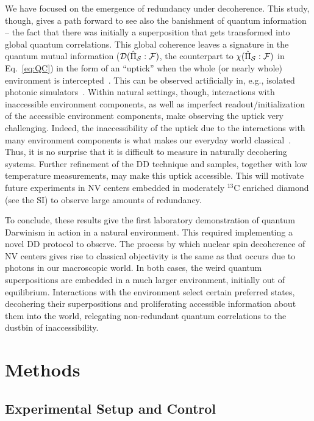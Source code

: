 \documentclass[aps,prl,floatfix,twocolumn,footinbib,superscriptaddress]{revtex4-1}
\begin{document}
We have focused on the emergence of redundancy under decoherence. This study, though, gives a path forward to see also the banishment of quantum information -- the fact that there was initially a superposition that gets transformed into global quantum correlations. This global coherence leaves a signature in the quantum mutual information ($\mathcal{D}(\hat{\Pi}_{\mathcal{S}}:\mathcal{F})$, the counterpart to $\chi ( \hat{\Pi}_{\mathcal{S}}:\mathcal{F} )$ in Eq.~\eqref{eq:QC}) in the form of an ``uptick'' when the whole (or nearly whole) environment is intercepted~\cite{Zwolak13-1}. This can be observed artificially in, e.g., isolated photonic simulators~\cite{Ciampini18-1,Chen18-1}. Within natural settings, though, interactions with inaccessible environment components, as well as imperfect readout/initialization of the accessible environment components, make observing the uptick very challenging. Indeed, the inaccessibility of the uptick due to the interactions with many environment components is what makes our everyday world classical~\cite{Zwolak13-1}. Thus, it is no surprise that it is difficult to measure in naturally decohering systems. Further refinement of the DD technique and samples, together with low temperature measurements, may make this uptick accessible. This will motivate future experiments in NV centers embedded in moderately $^{13}$C enriched diamond (see the SI) to observe large amounts of redundancy.

To conclude, these results give the first laboratory demonstration of quantum Darwinism in action in a natural environment. This required implementing a novel DD protocol to observe. The process by which nuclear spin decoherence of NV centers gives rise to classical objectivity is the same as that occurs due to photons in our macroscopic world. In both cases, the weird quantum superpositions are embedded in a much larger environment, initially out of equilibrium. Interactions with the environment select certain preferred states, decohering their superpositions and proliferating accessible information about them into the world, relegating non-redundant quantum correlations to the dustbin of inaccessibility. \\

\section*{\label{sec:Methods} Methods}

\subsection*{\label{sample}Experimental Setup and Control}
\end{document}
